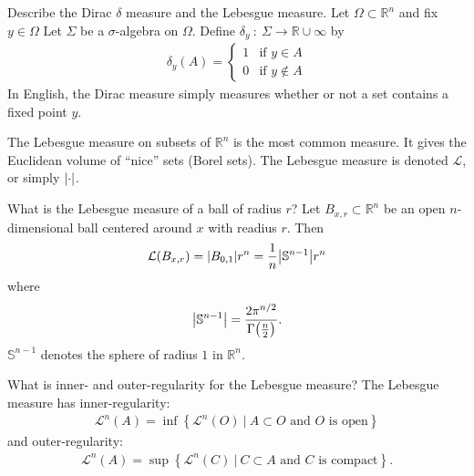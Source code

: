 \documentclass[avery5388,grid,frame]{flashcards}
\newcommand{\f}[3]{#1\ :\ #2 \rightarrow #3}
\def\Rl{\mathbb{R}}
\begin{document}
\begin{flashcard}
    {Describe the Dirac $\delta$ measure and the Lebesgue measure.}
    Let $\Omega \subset \Rl^n$ and fix $y \in \Omega$  Let $\Sigma$ be a $\sigma$-algebra on $\Omega$.  Define $\f{\delta_y}{\Sigma}{\Rl\cup\infty}$ by
    \begin{equation*}
        \begin{aligned}
            \delta_y(A) = \begin{cases}
                1 & \text{if } y \in A \\
                0 & \text{if } y \not\in A
            \end{cases}
        \end{aligned}
    \end{equation*}
    In English, the Dirac measure simply measures whether or not a set contains a fixed point $y$.

    The Lebesgue measure on subsets of $\Rl^n$ is the most common measure.  It gives the Euclidean volume of ``nice'' sets (Borel sets).  The Lebesgue measure is denoted $\mathcal{L}$, or simply $\abs{\cdot}$.
\end{flashcard}

\begin{flashcard}
    {What is the Lebesgue measure of a ball of radius $r$?}
    Let $B_{x,r} \subset \Rl^n$ be an open $n$-dimensional ball centered around $x$ with readius $r$.  Then
    \begin{align*}
        \mathcal{L}(B_{x,r}) = \abs{B_{0,1}}r^n  = \frac{1}{n}\abs{\mathbb{S}^{n-1}}r^n
    \end{align*}
    where
    \begin{align*}
        \abs{\mathbb{S}^{n-1}} = \frac{2\pi^{n/2}}{\Gamma\qty(\frac{n}{2})}.
    \end{align*}
    $\mathbb{S}^{n-1}$ denotes the sphere of radius $1$ in $\Rl^n$.
\end{flashcard}

\begin{flashcard}
    {What is inner- and outer-regularity for the Lebesgue measure?}
    The Lebesgue measure has inner-regularity:
    \begin{align*}
        \mathcal{L}^n(A) = \inf\left\{\mathcal{L}^n(O)\ |\ A \subset O \text{ and } O \text{ is open}\right\}
    \end{align*}
    and outer-regularity:
    \begin{align*}
        \mathcal{L}^n(A) = \sup\left\{\mathcal{L}^n(C)\ |\ C \subset A \text{ and } C \text{ is compact}\right\}.
    \end{align*}
\end{flashcard}
\end{document}
